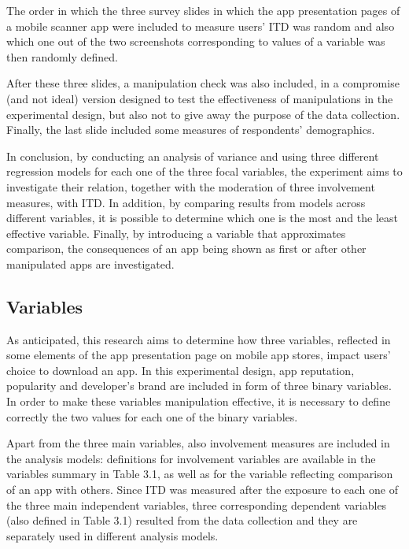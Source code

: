 The order in which the three survey slides in which the app presentation pages of a mobile scanner app were included to measure users' ITD was random and also which one out of the two screenshots corresponding to values of a variable was then randomly defined.

After these three slides, a manipulation check was also included, in a compromise (and not ideal) version designed to test the effectiveness of manipulations in the experimental design, but also not to give away the purpose of the data collection. Finally, the last slide included some measures of respondents' demographics.

In conclusion, by conducting an analysis of variance and using three different regression models for each one of the three focal variables, the experiment aims to investigate their relation, together with the moderation of three involvement measures, with ITD. In addition, by comparing results from models across different variables, it is possible to determine which one is the most and the least effective variable. Finally, by introducing a variable that approximates comparison, the consequences of an app being shown as first or after other manipulated apps are investigated.


\subsection{Variables}
As anticipated, this research aims to determine how three variables, reflected in some elements of the app presentation page on mobile app stores, impact users' choice to download an app. In this experimental design, app reputation, popularity and developer's brand are included in form of three binary variables. In order to make these variables manipulation effective, it is necessary to define correctly the two values for each one of the binary variables. 

Apart from the three main variables, also involvement measures are included in the analysis models: definitions for involvement variables are available in the variables summary in Table 3.1, as well as for the variable reflecting comparison of an app with others. Since ITD was measured after the exposure to each one of the three main independent variables, three corresponding dependent variables (also defined in Table 3.1) resulted from the data collection and they are separately used in different analysis models.


